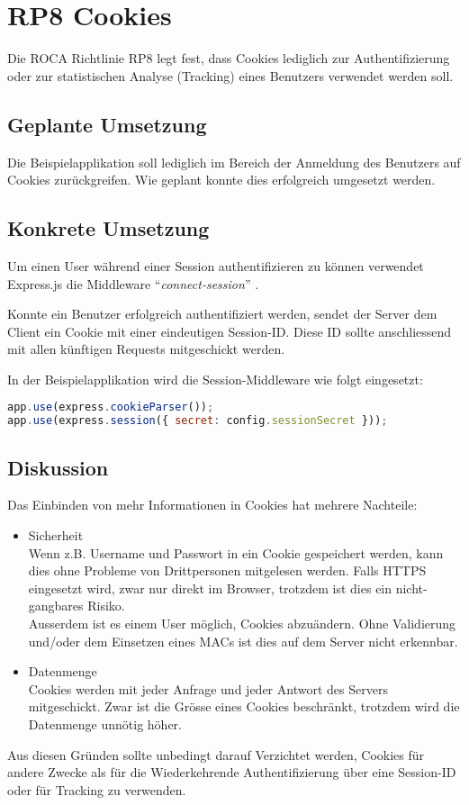 \section{RP8 Cookies}
\label{sec:principle-rp8-cookies}
Die ROCA Richtlinie RP8 legt fest, dass Cookies lediglich zur Authentifizierung oder zur statistischen Analyse (Tracking) eines Benutzers verwendet werden soll.

\subsection*{Geplante Umsetzung}
Die Beispielapplikation soll lediglich im Bereich der Anmeldung des Benutzers auf Cookies zurückgreifen. Wie geplant konnte dies erfolgreich umgesetzt werden.

\subsection*{Konkrete Umsetzung}
Um einen User während einer Session authentifizieren zu können verwendet Express.js \cite{Expressjs} die \gls{Middleware} ``\emph{connect-session}'' \cite{ConnectSession}.

Konnte ein Benutzer erfolgreich authentifiziert werden, sendet der Server dem Client ein Cookie mit einer eindeutigen Session-ID. Diese ID sollte anschliessend mit allen künftigen Requests mitgeschickt werden.

In der Beispielapplikation wird die Session-Middleware wie folgt eingesetzt:

\begin{lstlisting}[language=JavaScript, caption=Connect Session Middleware \cite{RoomiesMiddlewareHttp}, label=lst:connect-session-middleware]
app.use(express.cookieParser());
app.use(express.session({ secret: config.sessionSecret }));
\end{lstlisting}

\subsection*{Diskussion}
Das Einbinden von mehr Informationen in Cookies hat mehrere Nachteile:
\begin{itemize}
	\item Sicherheit \\
		Wenn z.B. Username und Passwort in ein Cookie gespeichert werden, kann dies ohne Probleme von Drittpersonen mitgelesen werden. Falls HTTPS eingesetzt wird, zwar nur direkt im Browser, trotzdem ist dies ein nicht-gangbares Risiko. \\
		Ausserdem ist es einem User möglich, Cookies abzuändern. Ohne Validierung und/oder dem Einsetzen eines \glspl{MAC} ist dies auf dem Server nicht erkennbar.
	\item Datenmenge \\
		Cookies werden mit jeder Anfrage und jeder Antwort des Servers mitgeschickt. Zwar ist die Grösse eines Cookies beschränkt, trotzdem wird die Datenmenge unnötig höher.
\end{itemize}

Aus diesen Gründen sollte unbedingt darauf Verzichtet werden, Cookies für andere Zwecke als für die Wiederkehrende Authentifizierung über eine Session-ID oder für Tracking zu verwenden.
